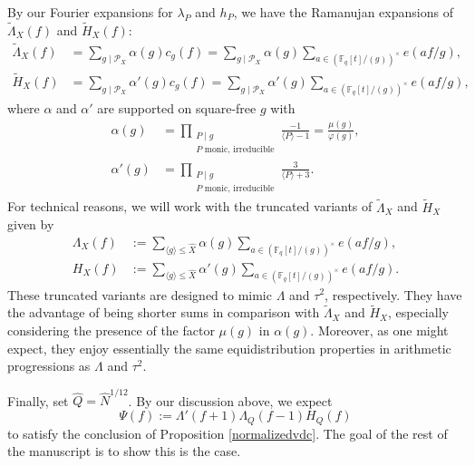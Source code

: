 \documentclass{article}
\theoremstyle{definition}
\theoremstyle{definition}
\theoremstyle{remark}
\newcommand{\F}{\mathbb{F}_q[t]}
\renewcommand\phi\varphi
\newcommand{\1}{\mathbf{1}}
\numberwithin{equation}{section}
\begin{document}
By our Fourier expansions for $\lambda_P$ and $h_P$, we have the Ramanujan expansions of $\widetilde{\Lambda}_X(f)$ and $\widetilde{H}_X(f)$:
\begin{align*}
\widetilde{\Lambda}_X(f)&=\sum_{g\mid \mathscr{P}_X}\alpha(g)c_{g}(f)=\sum_{g\mid \mathscr{P}_X}\alpha(g)\sum_{a\in (\F\slash (g))^\times}e(af\slash g),\\
\widetilde{H}_X(f)&=\sum_{g\mid \mathscr{P}_X}\alpha'(g)c_{g}(f)=\sum_{g\mid \mathscr{P}_X}\alpha'(g)\sum_{a\in (\F\slash (g))^\times}e(af\slash g),
\end{align*}
where $\alpha$ and $\alpha'$ are supported on square-free $g$ with 
\begin{align*}
\alpha(g)&=\prod_{\substack{P\mid g\\P\text{~monic, irreducible}}}\frac{-1}{\langle P \rangle -1}=\frac{\mu(g)}{\phi(g)},\\
\alpha'(g)&=\prod_{\substack{P\mid g\\P\text{~monic, irreducible}}}\frac{3}{\langle P \rangle +3}.
\end{align*}
For technical reasons, we will work with the truncated variants of $\widetilde{\Lambda}_X$ and $\widetilde{H}_X$ given by 
\begin{align*}
\Lambda_X(f)&:=\sum_{\langle g \rangle \leq \widehat{X}}\alpha(g)\sum_{a\in (\F\slash (g))^\times}e(af\slash g),\\  
H_X(f)&:=\sum_{\langle g \rangle \leq \widehat{X}}\alpha'(g)\sum_{a\in (\F\slash (g))^\times}e(af\slash g).
\end{align*}
These truncated variants are designed to mimic $\Lambda$ and $\tau^2$, respectively. They have the advantage of being shorter sums in comparison with $\widetilde{\Lambda}_X$ and $\widetilde{H}_X$, especially considering the presence of the factor $\mu(g)$ in $\alpha(g)$. Moreover, as one might expect, they enjoy essentially the same equidistribution properties in arithmetic progressions as $\Lambda$ and $\tau^2$.

Finally, set $\widehat{Q}=\widehat{N}^{1\slash 12}$. By our discussion above, we expect
\[\Psi(f):=\Lambda'(f+1)\Lambda_Q(f-1)H_Q(f)\]
to satisfy the conclusion of Proposition \ref{normalizedvdc}. The goal of the rest of the manuscript is to show this is the case. 

\end{document}
